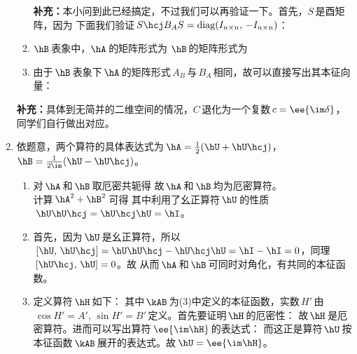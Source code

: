 \begin{enumerate}[label=2.\arabic*]
\begin{enumerate}[label=(\arabic*)]
\textbf{补充：}本小问到此已经搞定，不过我们可以再验证一下。首先，$S\,$是酉矩阵，因为 
下面我们验证$\,S\hcj B_AS=\mathrm{diag}(I_{n\times n},\,-I_{n\times n})$：
\setcounter{enumii}{1}
\item
$\hB\,$表象中，$\hA\,$的矩阵形式为
$\hB\,$的矩阵形式为
\setcounter{enumii}{3}
\item
由于$\,\hB\,$表象下$\,\hA\,$的矩阵形式$\,A_B\,$与$\,B_A\,$相同，故可以直接写出其本征向量：
\end{enumerate}
\textbf{补充：}具体到无简并的二维空间的情况，$C\,$退化为一个复数$\,c=\ee{\im\delta}$，同学们自行做出对应。

\item
依题意，两个算符的具体表达式为$\,\hA=\frac{1}{2}(\hU+\hU\hcj)$，$\hB=\frac{1}{2\im}(\hU-\hU\hcj)$。
\begin{enumerate}[label=(\arabic*)]
    \item 对$\,\hA\,$和$\,\hB\,$取厄密共轭得
    故$\,\hA\,$和$\,\hB\,$均为厄密算符。\\
    计算$\,\hA^2+\hB^2\,$可得
    其中利用了幺正算符$\,\hU\,$的性质$\,\hU\hU\hcj=\hU\hcj\hU=\hI$。
    \item 
    首先，因为$\,\hU\,$是幺正算符，所以$\,[\hU,\,\hU\hcj]=\hU\hU\hcj-\hU\hcj\hU=\hI-\hI=0$，同理$\,[\hU\hcj,\,\hU]=0$。故
    从而$\,\hA\,$和$\,\hB\,$可同时对角化，有共同的本征函数。
    \setcounter{enumii}{4}
    \item
    定义算符$\,\hH\,$如下：
    其中$\,\kAB\,$为(3)中定义的本征函数，实数$\,H'\,$由$\,\cos H'=A',\,\sin H'=B'\,$定义。首先要证明$\,\hH\,$的厄密性：
    故$\,\hH\,$是厄密算符。进而可以写出算符$\,\ee{\im\hH}\,$的表达式：
    而这正是算符$\,\hU\,$按本征函数$\,\kAB\,$展开的表达式。故$\,\hU=\ee{\im\hH}$。
\end{enumerate}

\end{enumerate}

